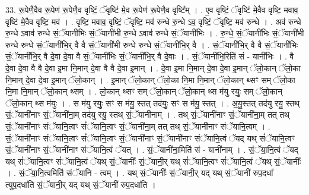 \documentclass[17pt]{extarticle}
\begin{document}
33. रू॒पेणै॒वैव रू॒पेण॑ रू॒पेणै॒व वृष्टिं॒ ॅवृष्टि॑ मे॒व रू॒पेण॑ रू॒पेणै॒व वृष्टि᳚म् । . ए॒व वृष्टिं॒ ॅवृष्टि॑ मे॒वैव वृष्टि॒ मवाव॒ वृष्टि॑ मे॒वैव वृष्टि॒ मव॑ । . वृष्टि॒ मवाव॒ वृष्टिं॒ ॅवृष्टि॒ मव॑ रुन्धे रु॒न्धे ऽव॒ वृष्टिं॒ ॅवृष्टि॒ मव॑ रुन्धे । . अव॑ रुन्धे रु॒न्धे ऽवाव॑ रुन्धे सं॒ॅयानी॑भिः सं॒ॅयानी॑भी रु॒न्धे ऽवाव॑ रुन्धे सं॒ॅयानी॑भिः । . रु॒न्धे॒ सं॒ॅयानी॑भिः सं॒ॅयानी॑भी रुन्धे रुन्धे सं॒ॅयानी॑भि॒र् वै वै सं॒ॅयानी॑भी रुन्धे रुन्धे सं॒ॅयानी॑भि॒र् वै । . सं॒ॅयानी॑भि॒र् वै वै सं॒ॅयानी॑भिः सं॒ॅयानी॑भि॒र् वै दे॒वा दे॒वा वै सं॒ॅयानी॑भिः सं॒ॅयानी॑भि॒र् वै दे॒वाः । . सं॒ॅयानी॑भि॒रिति॑ सं - यानी॑भिः । . वै दे॒वा दे॒वा वै वै दे॒वा इ॒मा नि॒मान् दे॒वा वै वै दे॒वा इ॒मान् । . दे॒वा इ॒मा नि॒मान् दे॒वा दे॒वा इ॒मान् ॅलो॒कान् ॅलो॒का नि॒मान् दे॒वा दे॒वा इ॒मान् ॅलो॒कान् । . इ॒मान् ॅलो॒कान् ॅलो॒का नि॒मा नि॒मान् ॅलो॒कान् थ्सꣳ सम् ॅलो॒का नि॒मा नि॒मान् ॅलो॒कान् थ्सम् । . लो॒कान् थ्सꣳ सम् ॅलो॒कान् ॅलो॒कान् थ्स म॑यु रयुः॒ सम् ॅलो॒कान् ॅलो॒कान् थ्स म॑युः । . स म॑यु रयुः॒ सꣳ स म॑यु॒ स्तत् तद॑युः॒ सꣳ स म॑यु॒ स्तत् । . अ॒यु॒स्तत् तद॑यु रयु॒ स्तथ् सं॒ॅयानी॑नाꣳ सं॒ॅयानी॑ना॒म् तद॑यु रयु॒ स्तथ् सं॒ॅयानी॑नाम् । . तथ् सं॒ॅयानी॑नाꣳ सं॒ॅयानी॑ना॒म् तत् तथ् सं॒ॅयानी॑नाꣳ संॅयानि॒त्वꣳ सं॑ॅयानि॒त्वꣳ सं॒ॅयानी॑ना॒म् तत् तथ् सं॒ॅयानी॑नाꣳ संॅयानि॒त्वम् । . सं॒ॅयानी॑नाꣳ संॅयानि॒त्वꣳ सं॑ॅयानि॒त्वꣳ सं॒ॅयानी॑नाꣳ सं॒ॅयानी॑नाꣳ संॅयानि॒त्वं ॅयद् यथ् सं॑ॅयानि॒त्वꣳ सं॒ॅयानी॑नाꣳ सं॒ॅयानी॑नाꣳ संॅयानि॒त्वं ॅयत् । . सं॒ॅयानी॑ना॒मिति॑ सं - यानी॑नाम् । . सं॒ॅया॒नि॒त्वं ॅयद् यथ् सं॑ॅयानि॒त्वꣳ सं॑ॅयानि॒त्वं ॅयथ् सं॒ॅयानीः᳚ सं॒ॅयानी॒र् यथ् सं॑ॅयानि॒त्वꣳ सं॑ॅयानि॒त्वं ॅयथ् सं॒ॅयानीः᳚ । . सं॒ॅया॒नि॒त्वमिति॑ संॅयानि - त्वम् । . यथ् सं॒ॅयानीः᳚ सं॒ॅयानी॒र् यद् यथ् सं॒ॅयानी॑ रुप॒दधा᳚ त्युप॒दधा॑ति सं॒ॅयानी॒र् यद् यथ् सं॒ॅयानी॑ रुप॒दधा॑ति । \newline
\end{document}
